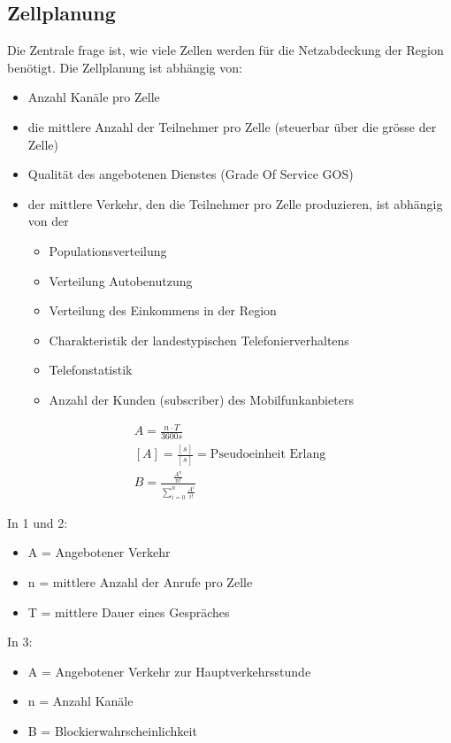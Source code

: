 \subsection{Zellplanung}
Die Zentrale frage ist, wie viele Zellen werden für die Netzabdeckung der Region benötigt. Die Zellplanung ist abhängig von:
\begin{itemize}
\item Anzahl Kanäle pro Zelle
\item die mittlere Anzahl der Teilnehmer pro Zelle (steuerbar über die grösse der Zelle)
\item Qualität des angebotenen Dienstes (Grade Of Service GOS)
\item der mittlere Verkehr, den die Teilnehmer pro Zelle produzieren, ist abhängig von der
\begin{itemize}
\item Populationsverteilung
\item Verteilung Autobenutzung
\item Verteilung des Einkommens in der Region
\item Charakteristik der landestypischen Telefonierverhaltens 
\item Telefonstatistik
\item Anzahl der Kunden (subscriber) des Mobilfunkanbieters
\end{itemize}
\end{itemize}
\begin{multicols}{2}
\begin{eqnarray}
A = \frac{n \cdot T}{3600 s} \\
\left[ A \right] = \frac{\left[ s \right] }{\left[ s \right] } = \text{Pseudoeinheit Erlang} \\
B = \frac{\frac{A^n}{n!}}{\sum_{i = 0}^{n} \frac{A^i}{i!}}
\end{eqnarray}
\columnbreak

In 1 und 2:
\begin{itemize}
\item A = Angebotener Verkehr
\item n = mittlere Anzahl der Anrufe pro Zelle
\item T = mittlere Dauer eines Gespräches
\end{itemize}
In 3:
\begin{itemize}
\item A = Angebotener Verkehr zur Hauptverkehrsstunde
\item n  = Anzahl Kanäle
\item B = Blockierwahrscheinlichkeit
\end{itemize}
\end{multicols}
